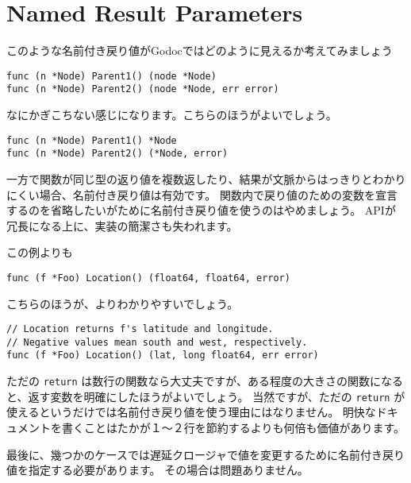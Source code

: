 \section{Named Result Parameters}


このような名前付き戻り値がGodocではどのように見えるか考えてみましょう

\begin{lstlisting}[]
func (n *Node) Parent1() (node *Node)
func (n *Node) Parent2() (node *Node, err error)
\end{lstlisting}

なにかぎこちない感じになります。こちらのほうがよいでしょう。

\begin{lstlisting}[]
func (n *Node) Parent1() *Node
func (n *Node) Parent2() (*Node, error)
\end{lstlisting}

一方で関数が同じ型の返り値を複数返したり、結果が文脈からはっきりとわかりにくい場合、名前付き戻り値は有効です。 関数内で戻り値のための変数を宣言するのを省略したいがために名前付き戻り値を使うのはやめましょう。 APIが冗長になる上に、実装の簡潔さも失われます。

この例よりも

\begin{lstlisting}[]
func (f *Foo) Location() (float64, float64, error)
\end{lstlisting}

こちらのほうが、よりわかりやすいでしょう。

\begin{lstlisting}[]
// Location returns f's latitude and longitude.
// Negative values mean south and west, respectively.
func (f *Foo) Location() (lat, long float64, err error)
\end{lstlisting}

ただの \texttt{return} は数行の関数なら大丈夫ですが、ある程度の大きさの関数になると、返す変数を明確にしたほうがよいでしょう。 当然ですが、ただの \texttt{return} が使えるというだけでは名前付き戻り値を使う理由にはなりません。 明快なドキュメントを書くことはたかが１〜２行を節約するよりも何倍も価値があります。

最後に、幾つかのケースでは遅延クロージャで値を変更するために名前付き戻り値を指定する必要があります。 その場合は問題ありません。

